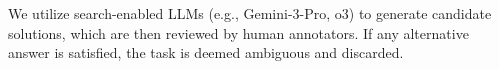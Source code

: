 We utilize search-enabled LLMs (e.g., Gemini-3-Pro, o3) to generate candidate solutions, which are then reviewed by human annotators. If any alternative answer is satisfied, the task is deemed ambiguous and discarded.

